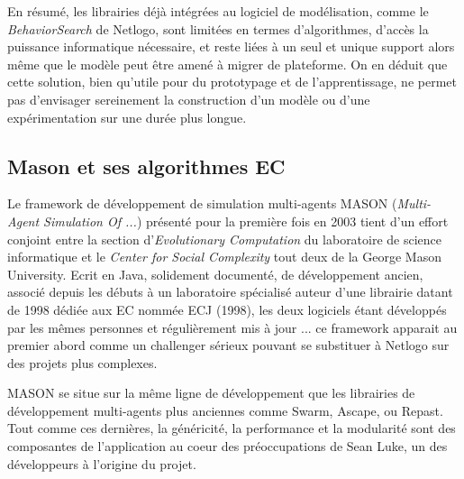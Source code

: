 En résumé, les librairies déjà intégrées au logiciel de modélisation, comme le \textit{BehaviorSearch} de Netlogo, sont limitées en termes d'algorithmes, d'accès la puissance informatique nécessaire, et reste liées à un seul et unique support alors même que le modèle peut être amené à migrer de plateforme. On en déduit que cette solution, bien qu'utile pour du prototypage et de l'apprentissage, ne permet pas d'envisager sereinement la construction d'un modèle ou d'une expérimentation sur une durée plus longue.

\subsection{Mason et ses algorithmes EC}

Le framework de développement de simulation multi-agents MASON (\textit{Multi-Agent Simulation Of ...}) présenté pour la première fois en 2003 tient d'un effort conjoint entre la section d'\textit{Evolutionary Computation} du laboratoire de science informatique et le \textit{Center for Social Complexity} tout deux de la George Mason University. Ecrit en Java, solidement documenté, de développement ancien, associé depuis les débuts à un laboratoire spécialisé auteur d'une librairie datant de 1998 dédiée aux EC nommée ECJ (1998), les deux logiciels étant développés par les mêmes personnes et régulièrement mis à jour ... ce framework apparait au premier abord comme un challenger sérieux pouvant se substituer à Netlogo sur des projets plus complexes.

MASON se situe sur la même ligne de développement que les librairies de développement multi-agents plus anciennes comme Swarm, Ascape, ou Repast. Tout comme ces dernières, la généricité, la performance et la modularité sont des composantes de l'application au coeur des préoccupations de Sean Luke, un des développeurs à l'origine du projet.

